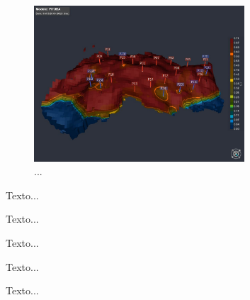 \begin{figure}[h]
	\centering
	\includegraphics[width=0.7\textwidth]{images/pituba}
	\caption{...}
\end{figure}

Texto...

Texto...

Texto...

Texto...

Texto...